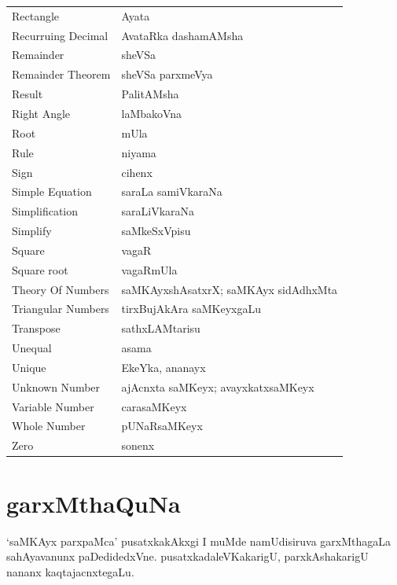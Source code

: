 \begin{longtable}{>{\rm}l@{\hspace{1.25cm}}l}
Rectangle & Ayata\\
Recurruing Decimal & AvataRka dashamAMsha\\
Remainder & sheVSa\\
Remainder Theorem & sheVSa parxmeVya\\
Result & PalitAMsha\\
Right Angle & laMbakoVna\\
Root & mUla\\
Rule & niyama\\
Sign & cihenx\\
Simple Equation & saraLa samiVkaraNa\\
Simplification & saraLiVkaraNa\\
Simplify & saMkeSxVpisu\\
Square & vagaR\\
Square root & vagaRmUla\\
Theory Of Numbers & saMKAyxshAsatxrX; saMKAyx sidAdhxMta\\
Triangular Numbers & tirxBujAkAra saMKeyxgaLu\\
Transpose & sathxLAMtarisu\\
Unequal & asama\\
Unique & EkeYka, ananayx\\
Unknown Number & ajAcnxta saMKeyx; avayxkatxsaMKeyx\\
Variable Number & carasaMKeyx\\
Whole Number & pUNaRsaMKeyx\\
Zero & sonenx
\end{longtable}

\eject
\section*{\hspace{4.5cm}garxMthaQuNa}

`saMKAyx parxpaMca' pusatxkakAkxgi I muMde namUdisiruva garxMthagaLa sahAyavanunx paDedidedxVne. pusatxkadaleVKakarigU, parxkAshakarigU nananx kaqtajacnxtegaLu.

